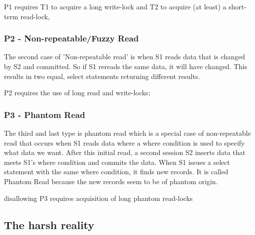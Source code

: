 \documentclass[a4paper,10pt,titlepage]{report}
\begin{document}
     P1 requires T1 to acquire a long write-lock and T2 to acquire (at least) a short-term read-lock,


    \subsubsection{P2 - Non-repeatable/Fuzzy Read}

   
    The second case of 'Non-repeatable read' is when S1 reads data that is changed by S2 and committed. So if S1 rereads the same data, it will have changed. This results in two equal, select statements returning different results.
    
     P2 requires the use of long read and write-locks; 


    \subsubsection{P3 - Phantom Read}

    The third and last type is phantom read which is a special case of non-repeatable read that occurs when S1 reads data where a where condition is used to specify what data we want. After this initial read, a second session S2 inserts data that meets S1's where condition and commits the data. When S1 issues a select statement with the same where condition, it finds new records. It is called Phantom Read because the new records seem to be of phantom origin.
    
    disallowing P3 requires acquisition of long phantom read-locks

    
\newpage
\subsection{The harsh reality}
    
\end{document}
